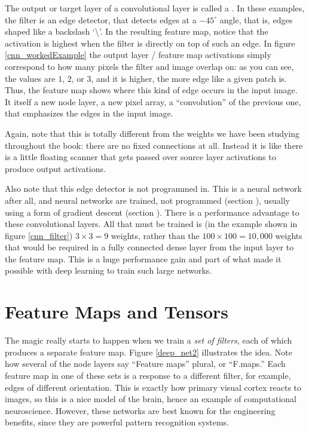 The output or target layer of a convolutional layer is called a . In these examples, the filter is an edge detector, that detects edges at a $-45^\circ$ angle, that is, edges shaped like a backslash `\textbackslash'. In the resulting feature map, notice that the activation is highest when the filter is directly on top of such an edge. In figure \ref{cnn_workedExample} the output layer / feature map activations simply correspond to how many pixels the filter and image overlap on: as you can see, the values are $1$, $2$, or $3$, and it is higher, the more edge like a given patch is. Thus, the feature map shows where this kind of edge occurs in the input image. It itself a new node layer, a new pixel array, a ``convolution'' of the previous one, that emphasizes the edges in the input image.

Again, note that this is totally different from the weights we have been studying throughout the book: there are no fixed connections at all. Instead it is like there is a little floating scanner that gets passed over source layer activations to produce output activations.

Also note that this edge detector is not programmed in. This is a neural network after all, and neural networks are trained, not programmed (section ), usually using a form of gradient descent (section ). There is a performance advantage to these convolutional layers. All that must be trained is (in the example shown in figure \ref{cnn_filter}) $3 \times 3=9$ weights, rather than the $100 \times 100 = 10,000$ weights that would be required in a fully connected dense layer from the input layer to the feature map. This is a huge performance gain and part of what  made it possible with deep learning to train such large networks.

\section{Feature Maps and Tensors}

The magic really starts to happen when we train a \emph{set of filters}, each of which produces a separate feature map.  Figure \ref{deep_net2} illustrates the idea. Note how several of the node layers say ``Feature maps'' plural, or ``F.maps.'' Each feature map in one of these sets is a response to a different filter, for example, edges of different orientation. This is exactly how primary visual cortex reacts to images, so this is a nice model of the brain, hence an example of computational  neuroscience. However, these networks are best known for the engineering benefits, since they are powerful pattern recognition systems.


